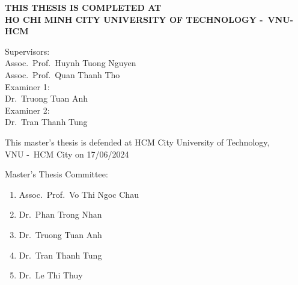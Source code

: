 \documentclass[a4paper,oneside]{book}
\begin{document}
\newpage
\begin{titlepage}

  \begin{center}
    {\fontsize{12pt}{1}\textbf{THIS THESIS IS COMPLETED AT}} \\
    \fontsize{12pt}{1}\textbf{HO CHI MINH CITY UNIVERSITY OF TECHNOLOGY -\ VNU-HCM}
  \end{center}

  \vspace{0.2cm}

  \begin{flushleft}
    {
    {\fontsize{12pt}{1}  Supervisors:}\\
    {\fontsize{12pt}{1}  Assoc.\ Prof.\ Huynh Tuong Nguyen}\\
    {\fontsize{12pt}{1}  Assoc.\ Prof.\ Quan Thanh Tho}\\
    {\fontsize{12pt}{1}  Examiner 1:}\\
    {\fontsize{12pt}{1}  Dr.\ Truong Tuan Anh}\\
    {\fontsize{12pt}{1}  Examiner 2:}\\
    {\fontsize{12pt}{1}  Dr.\ Tran Thanh Tung}\\
    }
  \end{flushleft}

  \vspace{0.2cm}

  \begin{center}
    {\fontsize{12pt}{1} This master's thesis is defended at HCM City University of Technology,}\\
    {\fontsize{12pt}{1} VNU -\ HCM City on 17/06/2024}\\[0.2cm]
  \end{center}

  \vspace{0.1cm}

  \begin{flushleft}
    {{\fontsize{12}{1} Master's Thesis Committee:}}
    \begin{enumerate}
      \item Assoc.\ Prof.\ Vo Thi Ngoc Chau
      \item Dr.\ Phan Trong Nhan
      \item Dr.\ Truong Tuan Anh
      \item Dr.\ Tran Thanh Tung
      \item Dr.\ Le Thi Thuy
    \end{enumerate}


\end{flushleft}
\end{titlepage}
\end{document}
